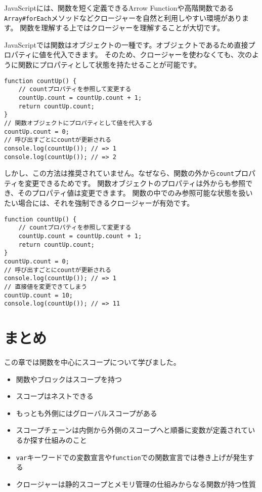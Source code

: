 JavaScriptには、関数を短く定義できるArrow
Functionや高階関数である\texttt{Array\#forEach}メソッドなどクロージャーを自然と利用しやすい環境があります。
関数を理解する上ではクロージャーを理解することが大切です。

\begin{tcolorbox}[title=状態を持つ関数オブジェクト]\label{closure-vs-function-object}

JavaScriptでは関数はオブジェクトの一種です。オブジェクトであるため直接プロパティに値を代入できます。
そのため、クロージャーを使わなくても、次のように関数にプロパティとして状態を持たせることが可能です。

\begin{lstlisting}
function countUp() {
    // countプロパティを参照して変更する
    countUp.count = countUp.count + 1;
    return countUp.count;
}
// 関数オブジェクトにプロパティとして値を代入する
countUp.count = 0;
// 呼び出すごとにcountが更新される
console.log(countUp()); // => 1
console.log(countUp()); // => 2
\end{lstlisting}

しかし、この方法は推奨されていません。なぜなら、関数の外から\texttt{count}プロパティを変更できるためです。
関数オブジェクトのプロパティは外からも参照でき、そのプロパティ値は変更できます。
関数の中でのみ参照可能な状態を扱いたい場合には、それを強制できるクロージャーが有効です。

\begin{lstlisting}
function countUp() {
    // countプロパティを参照して変更する
    countUp.count = countUp.count + 1;
    return countUp.count;
}
countUp.count = 0;
// 呼び出すごとにcountが更新される
console.log(countUp()); // => 1
// 直接値を変更できてしまう
countUp.count = 10;
console.log(countUp()); // => 11
\end{lstlisting}
\end{tcolorbox}

\hypertarget{conclusion}{%
\section{まとめ}\label{conclusion}}

この章では関数を中心にスコープについて学びました。

\begin{itemize}
\item
  関数やブロックはスコープを持つ
\item
  スコープはネストできる
\item
  もっとも外側にはグローバルスコープがある
\item
  スコープチェーンは内側から外側のスコープへと順番に変数が定義されているか探す仕組みのこと
\item
  \texttt{var}キーワードでの変数宣言や\texttt{function}での関数宣言では巻き上げが発生する
\item
  クロージャーは静的スコープとメモリ管理の仕組みからなる関数が持つ性質
\end{itemize}
